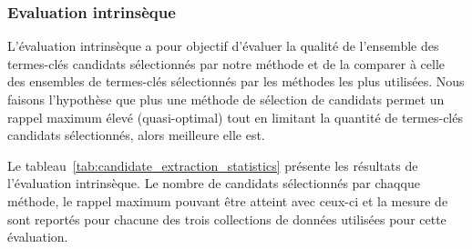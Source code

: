       \subsubsection{Evaluation intrinsèque}
      \label{subsubsec:main-automatic_keyphrase_annotation-keyphrase_candidate_selection-evaluation-intrinsic_evaluation}
        L'évaluation intrinsèque a pour objectif d'évaluer la qualité de
        l'ensemble des termes-clés candidats sélectionnés par notre méthode et
        de la comparer à celle des ensembles de termes-clés sélectionnés par les
        méthodes les plus utilisées. Nous faisons l'hypothèse que plus une
        méthode de sélection de candidats permet un rappel maximum élevé
        (quasi-optimal) tout en limitant la quantité de termes-clés candidats
        sélectionnés, alors meilleure elle est.

        Le tableau~\ref{tab:candidate_extraction_statistics} présente les
        résultats de l'évaluation intrinsèque. Le nombre de candidats
        sélectionnés par chaqque méthode, le rappel maximum pouvant être atteint
        avec ceux-ci et la mesure de  sont reportés pour chacune des trois
        collections de données utilisées pour cette évaluation.
        \begin{table}[!h]
          \centering
          \caption{Résultats de l'évaluation intrinsèque des méthodes de
                   sélection des termes-clés candidats
                   \label{tab:candidate_extraction_statistics}}
        \end{table}
        
